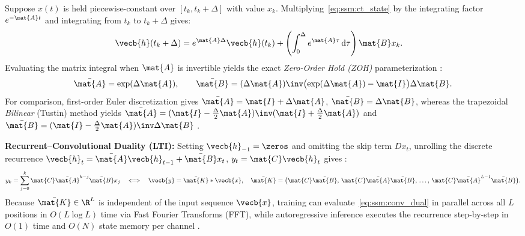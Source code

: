 \documentclass[../../../../master.tex]{subfiles}
\begin{document}
\begin{coremath}
Suppose $x(t)$ is held piecewise-constant over $[t_k, t_k + \Delta]$ with value $x_k$. Multiplying~\eqref{eq:ssm:ct_state} by the integrating factor $e^{-\mat{A}t}$ and integrating from $t_k$ to $t_k + \Delta$ gives:
\begin{align}
  \vecb{h}(t_k + \Delta) &= e^{\mat{A}\Delta}\vecb{h}(t_k) + \left(\int_0^{\Delta} e^{\mat{A}\tau}\,\mathrm{d}\tau\right)\mat{B} x_k.
\end{align}
Evaluating the matrix integral when $\mat{A}$ is invertible yields the exact \emph{Zero-Order Hold (ZOH)} parameterization :
\begin{equation}\label{eq:ssm:zoh}
  \bar{\mat{A}} = \exp(\Delta\mat{A}), \qquad \bar{\mat{B}} = (\Delta\mat{A})\inv\bigl(\exp(\Delta\mat{A}) - \mat{I}\bigr)\Delta\mat{B}.
\end{equation}
For comparison, first-order Euler discretization gives $\bar{\mat{A}} = \mat{I} + \Delta\mat{A}$, $\bar{\mat{B}} = \Delta\mat{B}$, whereas the trapezoidal \emph{Bilinear} (Tustin) method yields $\bar{\mat{A}} = (\mat{I} - \frac{\Delta}{2}\mat{A})\inv(\mat{I} + \frac{\Delta}{2}\mat{A})$ and $\bar{\mat{B}} = (\mat{I} - \frac{\Delta}{2}\mat{A})\inv\Delta\mat{B}$ .

\textbf{Recurrent--Convolutional Duality (LTI):} Setting $\vecb{h}_{-1} = \zeros$ and omitting the skip term $Dx_t$, unrolling the discrete recurrence $\vecb{h}_t = \bar{\mat{A}}\vecb{h}_{t-1} + \bar{\mat{B}}x_t$, $y_t = \mat{C}\vecb{h}_t$ gives :
\begin{equation}\label{eq:ssm:conv_dual}
  y_k = \sum_{j=0}^{k} \mat{C}\bar{\mat{A}}^{k-j}\bar{\mat{B}} x_j \quad \Longleftrightarrow \quad \vecb{y} = \bar{\mat{K}} * \vecb{x}, \quad \bar{\mat{K}} = \bigl(\mat{C}\bar{\mat{B}},\, \mat{C}\bar{\mat{A}}\bar{\mat{B}},\, \dots,\, \mat{C}\bar{\mat{A}}^{L-1}\bar{\mat{B}}\bigr).
\end{equation}
Because $\bar{\mat{K}} \in \R^L$ is independent of the input sequence $\vecb{x}$, training can evaluate~\eqref{eq:ssm:conv_dual} in parallel across all $L$ positions in $O(L \log L)$ time via Fast Fourier Transforms (FFT), while autoregressive inference executes the recurrence step-by-step in $O(1)$ time and $O(N)$ state memory per channel .
\end{coremath}
\end{document}
